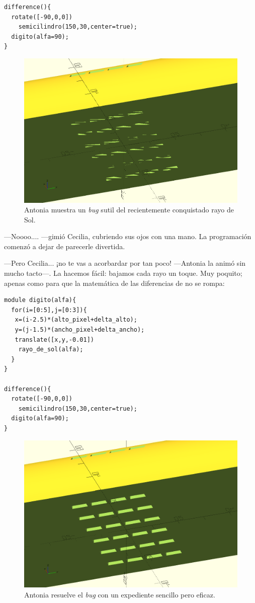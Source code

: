 \begin{lstlisting}
difference(){
  rotate([-90,0,0])
    semicilindro(150,30,center=true);  
  digito(alfa=90);
}
    \end{lstlisting}

    \begin{figure}[ht]
      \centering
      \includegraphics[width=.65\textwidth]{imagenes/digito-al-ras}
      \caption{Antonia muestra un \emph{bug} sutil del recientemente
        conquistado rayo de Sol.}
      \label{fig:digito-al-ras}
    \end{figure}
     



    ---Noooo.... ---gimió Cecilia, cubriendo sus ojos con una mano. La
    programación comenzó a dejar de parecerle divertida.

    ---Pero Cecilia... ¡no te vas a acorbardar por tan poco!
    ---Antonia la animó sin mucho tacto---. La hacemos fácil: bajamos
    cada rayo un toque. Muy poquito; apenas como para que la
    matemática de las diferencias de \openscad{} no se rompa:

    
\begin{lstlisting}
module digito(alfa){
  for(i=[0:5],j=[0:3]){
   x=(i-2.5)*(alto_pixel+delta_alto);
   y=(j-1.5)*(ancho_pixel+delta_ancho);
   translate([x,y,-0.01])
    rayo_de_sol(alfa);
  } 
}

difference(){
  rotate([-90,0,0])
    semicilindro(150,30,center=true);  
  digito(alfa=90);
}
    \end{lstlisting}

    \begin{figure}[ht]
      \centering
      \includegraphics[width=.65\textwidth]{imagenes/digito-apenas-descendido}
      \caption{Antonia resuelve el \emph{bug} con un expediente
        sencillo pero eficaz.}
      \label{fig:digito-apenas-descendido}
    \end{figure}
      



